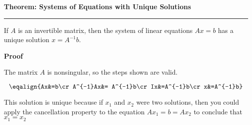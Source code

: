 \nopagenumbers
{\bf Theorem: Systems of Equations with Unique Solutions}
\vskip 1mm
\hrule

\vskip 6pt
If $A$ is an invertible matrix, then the system of linear equations $Ax=b$ has a unique solution $x=A^{-1}b$.

\vskip 10pt
{\bf Proof}

\vskip 6pt
The matrix $A$ is nonsingular, so the steps shown are valid.

$$\eqalign{Ax&=b\cr
	A^{-1}Ax&= A^{-1}b\cr
	Ix&=A^{-1}b\cr
	x&=A^{-1}b}$$

This solution is unique because if $x_1$ and $x_2$ were two solutions, then you could apply the cancellation property to the equation $Ax_1=b=Ax_2$ to conclude that $x_1=x_2$
\vfill\eject
\bye
